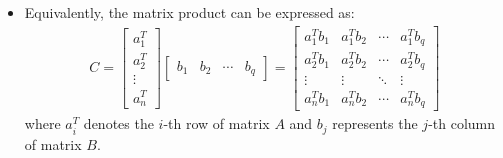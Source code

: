 \begin{frame}{}
\begin{itemize}
    \item Equivalently, the matrix product can be expressed as:
    \begin{align}
        C = \begin{bmatrix}
            a_1^T\\
            a_2^T\\
            \vdots\\
            a_n^T
        \end{bmatrix}\begin{bmatrix}
            b_1 & b_2 & \cdots & b_q
        \end{bmatrix} = \begin{bmatrix}
            a_1^T b_1 & a_1^T b_2 & \cdots & a_1^T b_q\\
            a_2^T b_1 & a_2^T b_2 & \cdots & a_2^T b_q\\
            \vdots & \vdots & \ddots & \vdots\\
            a_n^T b_1 & a_n^T b_2 & \cdots & a_n^T b_q
        \end{bmatrix}
    \end{align}
    where $a_i^T$ denotes the $i$-th row of matrix $A$ and $b_j$ represents the $j$-th column of matrix $B$.
\end{itemize}
\end{frame}

